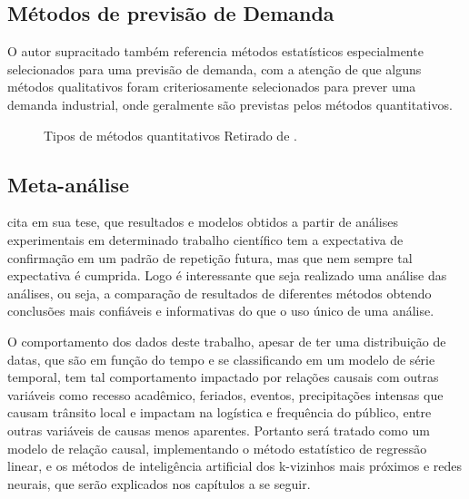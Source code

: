 \documentclass[	12pt, Times, openright, twoside, a4paper, english, brazil]{abntex2}
\begin{document}
\subsection{Métodos de previsão de Demanda}
O autor supracitado também referencia métodos estatísticos especialmente selecionados para uma previsão de demanda, com a atenção de que alguns métodos qualitativos foram criteriosamente selecionados para prever uma demanda industrial, onde geralmente são previstas pelos métodos quantitativos.

\begin{figure}[!ht]
	\caption{Tipos de métodos quantitativos Retirado de \cite{Junior2007}.\label{fig:metodosPrevisaoDemanda}}
\end{figure}


\subsection{Meta-análise}
\cite{Flavia2014} cita em sua tese, que resultados e modelos obtidos a partir de análises experimentais em determinado trabalho científico tem a expectativa de confirmação em um padrão de repetição futura, mas que nem sempre tal expectativa é cumprida. Logo é interessante que seja realizado uma análise das análises, ou seja, a comparação de resultados de diferentes métodos obtendo conclusões mais confiáveis e informativas do que o uso único de uma análise.

O comportamento dos dados deste trabalho, apesar de ter uma distribuição de datas, que são em função do tempo e se classificando em um modelo de série temporal, tem tal comportamento impactado por relações causais com outras variáveis como recesso acadêmico, feriados, eventos, precipitações intensas que causam trânsito local e impactam na logística e frequência do público, entre outras variáveis de causas menos aparentes. Portanto será tratado como um modelo de relação causal, implementando o método estatístico de regressão linear, e os métodos de inteligência artificial dos k-vizinhos mais próximos e redes neurais, que serão explicados nos capítulos a se seguir.
\end{document}
